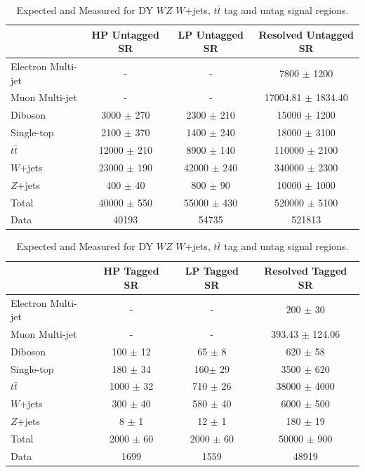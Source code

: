 \begin{table}
\begin{tabular}{|l|c|c|c|}
\hline
	  &	 HP Untagged SR &	 LP Untagged SR &	Resolved Untagged SR \\\hline 
	Electron Multi-jet &	- &	- &	7800 $\pm$ 1200 \\\hline 
	Muon Multi-jet &	- &	- &	17004.81 $\pm$ 1834.40 \\\hline 
	Diboson &	3000 $\pm$ 270 &	2300 $\pm$ 210 &	15000 $\pm$ 1200 \\\hline 
	Single-top &	2100 $\pm$ 370 &	1400 $\pm$ 240 &	18000 $\pm$ 3100\\\hline 
	$t\bar{t}$ &	12000 $\pm$ 210 &	8900 $\pm$ 140 &	110000 $\pm$ 2100 \\\hline 
	$W$+jets &	23000 $\pm$ 190&	42000 $\pm$ 240 &	340000 $\pm$ 2300 \\\hline 
	$Z$+jets &	400 $\pm$ 40 &	800 $\pm$ 90 &	10000 $\pm$ 1000 \\\hline 
	Total &	40000 $\pm$ 550 &	55000 $\pm$ 430 &	520000 $\pm$ 5100 \\\hline 
	Data &	40193 &	54735 &	521813 \\\hline 
\end{tabular}

\begin{tabular}{|l|c|c|c|}
\hline
	  &	 HP Tagged SR &	 LP Tagged SR &	Resolved Tagged SR \\\hline 
	Electron Multi-jet &	- &	- &	200 $\pm$ 30 \\\hline 
	Muon Multi-jet &	- &	- &	393.43 $\pm$ 124.06 \\\hline 
	Diboson &	100 $\pm$ 12 &	65 $\pm$ 8 &	620 $\pm$ 58 \\\hline 
	Single-top &	180 $\pm$ 34 &	160$\pm$ 29 &	3500 $\pm$ 620 \\\hline 
	$t\bar{t}$ &	1000 $\pm$ 32 &	710 $\pm$ 26 &	38000 $\pm$ 4000 \\\hline 
	$W$+jets &	300 $\pm$ 40 &	580 $\pm$ 40 &	6000 $\pm$ 500 \\\hline 
	$Z$+jets &	8 $\pm$ 1 &	12 $\pm$ 1 &	180 $\pm$ 19 \\\hline 
	Total &	2000 $\pm$ 60 &	2000 $\pm$ 60 &	50000 $\pm$ 900 \\\hline 
	Data &	1699 &	1559 &	48919 \\\hline 
\end{tabular}
\caption{Expected and Measured for DY $WZ$ $W$+jets, $t\bar{t}$ tag and untag signal regions.}
\label{tbl:hvtwz_yields_tcr}
\end{table}

